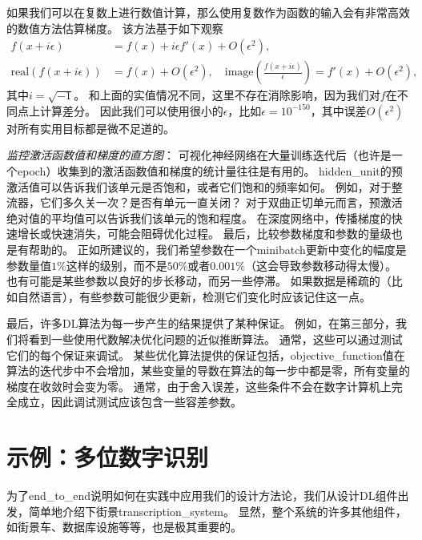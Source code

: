 
如果我们可以在复数上进行数值计算，那么使用复数作为函数的输入会有非常高效的数值方法估算梯度\citep{Squire+Trapp-1998}。
该方法基于如下观察
\begin{align}
	f(x + i\epsilon) &= f(x) + i\epsilon f'(x) + O(\epsilon^2) ,\\
	\text{real}( f(x+i\epsilon) ) &= f(x) + O(\epsilon^2), \quad \text{image}( \frac{f(x+i\epsilon)}{ \epsilon } ) = f'(x) + O(\epsilon^2),
\end{align}
其中$i=\sqrt{-1}$。
和上面的实值情况不同，这里不存在消除影响，因为我们对$f$在不同点上计算差分。
因此我们可以使用很小的$\epsilon$，比如$\epsilon = 10^{-150}$，其中误差$O(\epsilon^2)$对所有实用目标都是微不足道的。


\emph{监控激活函数值和梯度的直方图}：
可视化神经网络在大量训练迭代后（也许是一个\gls{epoch}）收集到的激活函数值和梯度的统计量往往是有用的。
\gls{hidden_unit}的预激活值可以告诉我们该单元是否饱和，或者它们饱和的频率如何。
例如，对于整流器，它们多久关一次？是否有单元一直关闭？
对于双曲正切单元而言，预激活绝对值的平均值可以告诉我们该单元的饱和程度。
在深度网络中，传播梯度的快速增长或快速消失，可能会阻碍优化过程。
最后，比较参数梯度和参数的量级也是有帮助的。
正如\citep{Bottou-DLSS2015}所建议的，我们希望参数在一个\gls{minibatch}更新中变化的幅度是参数量值$1\%$这样的级别，而不是$50\%$或者$0.001\%$（这会导致参数移动得太慢）。
也有可能是某些参数以良好的步长移动，而另一些停滞。
如果数据是稀疏的（比如自然语言），有些参数可能很少更新，检测它们变化时应该记住这一点。


最后，许多\gls{DL}算法为每一步产生的结果提供了某种保证。
例如，在第三部分，我们将看到一些使用代数解决优化问题的近似推断算法。
通常，这些可以通过测试它们的每个保证来调试。
某些优化算法提供的保证包括，\gls{objective_function}值在算法的迭代步中不会增加，某些变量的导数在算法的每一步中都是零，所有变量的梯度在收敛时会变为零。
通常，由于舍入误差，这些条件不会在数字计算机上完全成立，因此调试测试应该包含一些容差参数。


\section{示例：多位数字识别}
\label{sec:example_multi_digit_number_recognition}
为了\gls{end_to_end}说明如何在实践中应用我们的设计方法论，我们从设计\gls{DL}组件出发，简单地介绍下街景\gls{transcription_system}。
显然，整个系统的许多其他组件，如街景车、数据库设施等等，也是极其重要的。

